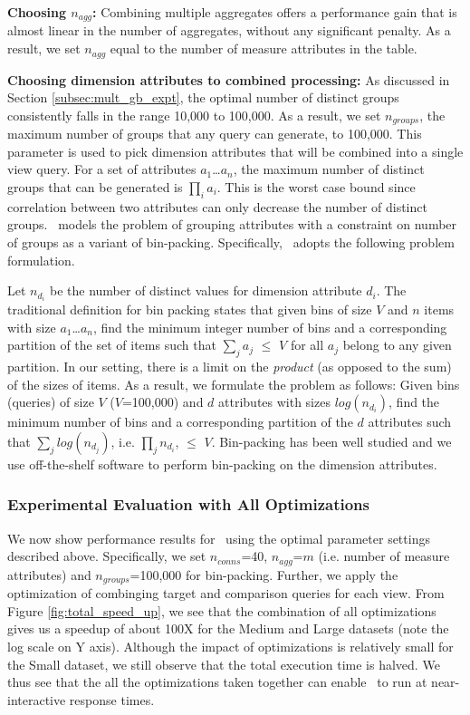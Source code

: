 {\bf Choosing $n_{agg}$:} Combining multiple aggregates offers a performance
gain that is almost linear in the number of aggregates, without any significant
penalty. As a result, we set $n_{agg}$ equal to the number of measure attributes
in the table.

{\bf Choosing dimension attributes to combined processing:}  As discussed in
Section \ref{subsec:mult_gb_expt}, the optimal number of distinct groups
consistently falls in the range 10,000 to 100,000. As a result, we set
$n_{groups}$, the maximum number of groups that any query can generate, to
100,000.
This parameter is used to pick dimension attributes that will be combined into a
single view query. For a set of attributes $a_1$\ldots$a_n$, the maximum number
of distinct groups that can be generated is $\prod_i a_i$. This is the worst
case bound since correlation between two attributes can only decrease the number
of distinct groups. \VizRecDB\ models the problem of grouping attributes with a
constraint on number of groups as a variant of bin-packing.
Specifically, \VizRecDB\ adopts the following problem formulation.

Let $n_{d_{i}}$ be the number of distinct values for dimension attribute $d_i$.
The traditional definition for bin packing states that given bins of size $V$
and $n$ items with size $a_1$\ldots$a_n$, find the minimum integer number of
bins and a corresponding partition of the set of items such that $\sum_{j} a_j$
$\leq$ $V$ for all $a_j$ belong to any given partition. In our setting, there is
a limit on the {\it product} (as opposed to the sum) of the sizes of items. As a
result, we formulate the problem as follows: Given bins (queries) of size $V$
($V$=100,000) and $d$ attributes with sizes $log(n_{d_{i}})$, find
the minimum number of bins and a corresponding partition of the $d$ attributes
such that $\sum_{j} log(n_{d_{j}})$, i.e. $\prod_{j} n_{d_{i}}$, $\leq$ $V$.
Bin-packing has been well studied and we use off-the-shelf software
\cite{glpk} to perform bin-packing on the dimension attributes.

\subsubsection{Experimental Evaluation with All Optimizations}

We now show performance results for \VizRecDB\ using the optimal parameter settings
described above. Specifically, we set $n_{conns}$=40, $n_{agg}$=$m$ (i.e.
number of measure attributes) and $n_{groups}$=100,000 for bin-packing. Further,
we apply the optimization of combinging target and comparison queries for each view. From
Figure \ref{fig:total_speed_up}, we see that the combination of all
optimizations gives us a speedup of about 100X for the Medium and Large
datasets (note the log scale on Y axis). Although the impact of optimizations is
relatively small for the Small dataset, we still observe that the total
execution time is halved. We thus see that the all the optimizations
taken together can enable \VizRecDB\ to run at near-interactive response times.

